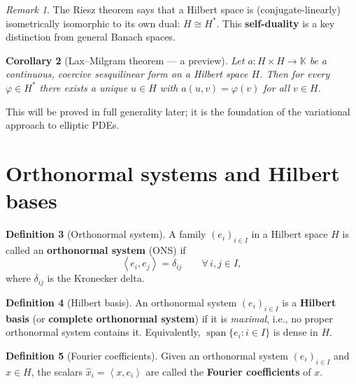 \documentclass[a4paper,12pt]{book}
\DeclareMathOperator{\spn}{span}
\newcommand{\K}{\mathbb{K}}
\newcommand{\inner}[2]{\left\langle #1, #2 \right\rangle}
\theoremstyle{definition}
\newtheorem{definition}{Definition}[chapter]
\theoremstyle{plain}
\newtheorem{corollary}[definition]{Corollary}
\theoremstyle{remark}
\newtheorem{remark}[definition]{Remark}
\begin{document}
\begin{remark}
\label{rem:riesz-self-dual}
The Riesz theorem says that a Hilbert space is (conjugate-linearly)
isometrically isomorphic to its own dual: $H\cong H^*$.  This
\textbf{self-duality} is a key
distinction from general Banach spaces.
\end{remark}

\begin{corollary}[{Lax--Milgram theorem --- a preview}]
\label{cor:lax-milgram-preview}
Let $a:H\times H\to\K$ be a continuous, coercive sesquilinear form on a
Hilbert space $H$.  Then for every $\varphi\in H^*$ there exists a unique
$u\in H$ with $a(u,v)=\varphi(v)$ for all $v\in H$.
\end{corollary}

This will be proved in full generality later; it is the foundation of
the variational approach to elliptic PDEs.

\section{Orthonormal systems and Hilbert bases}
\label{sec:hilbert-bases}

\begin{definition}[Orthonormal system]
\label{def:ONS}
A family $(e_i)_{i\in I}$ in a Hilbert space $H$ is called an
\textbf{orthonormal system} (ONS) if
\[
  \inner{e_i}{e_j} = \delta_{ij}
  \qquad\forall\, i,j\in I,
\]
where $\delta_{ij}$ is the Kronecker delta.
\end{definition}

\begin{definition}[Hilbert basis]
\label{def:hilbert-basis}
An orthonormal system $(e_i)_{i\in I}$ is a \textbf{Hilbert basis}
(or \textbf{complete orthonormal system}) if it is \emph{maximal},
i.e., no proper orthonormal system contains it.  Equivalently,
$\spn\{e_i:i\in I\}$ is dense in $H$.
\end{definition}

\begin{definition}[Fourier coefficients]
\label{def:fourier-coeff}
Given an orthonormal system $(e_i)_{i\in I}$ and $x\in H$, the scalars
$\hat{x}_i = \inner{x}{e_i}$ are called the \textbf{Fourier coefficients}
of $x$.
\end{definition}
\end{document}
